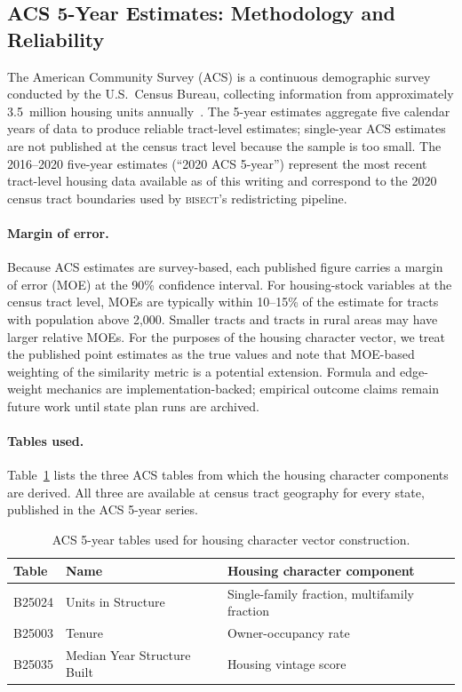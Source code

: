 \label{sec:background}

\subsection{ACS 5-Year Estimates: Methodology and Reliability}

The American Community Survey (ACS) is a continuous demographic survey conducted
by the U.S.\ Census Bureau, collecting information from approximately 3.5~million
housing units annually~\citep{acs2020}.
The 5-year estimates aggregate five calendar years of data to produce reliable
tract-level estimates; single-year ACS estimates are not published at the census
tract level because the sample is too small.
The 2016--2020 five-year estimates (``2020 ACS 5-year'') represent the most
recent tract-level housing data available as of this writing and correspond
to the 2020 census tract boundaries used by \textsc{bisect}'s redistricting pipeline.

\paragraph{Margin of error.}
Because ACS estimates are survey-based, each published figure carries a margin
of error (MOE) at the 90\% confidence interval.
For housing-stock variables at the census tract level, MOEs are typically within
10--15\% of the estimate for tracts with population above 2,000.
Smaller tracts and tracts in rural areas may have larger relative MOEs.
For the purposes of the housing character vector, we treat the published point
estimates as the true values and note that MOE-based weighting of the similarity
metric is a potential extension.
Formula and edge-weight mechanics are implementation-backed; empirical outcome
claims remain future work until state plan runs are archived.

\paragraph{Tables used.}
Table~\ref{tab:acs-tables} lists the three ACS tables from which the housing
character components are derived.
All three are available at census tract geography for every state, published
in the ACS 5-year series.

\begin{table}[ht]
\centering
\caption{ACS 5-year tables used for housing character vector construction.}
\label{tab:acs-tables}
\small
\begin{tabularx}{\textwidth}{llX}
\toprule
Table & Name & Housing character component \\
\midrule
B25024 & Units in Structure & Single-family fraction, multifamily fraction \\
B25003 & Tenure & Owner-occupancy rate \\
B25035 & Median Year Structure Built & Housing vintage score \\
\bottomrule
\end{tabularx}
\end{table}

